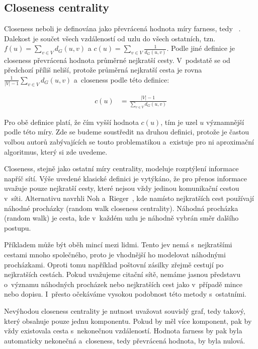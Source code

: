 \documentclass{bakalarka}
\begin{document}
\subsection{Closeness centrality}
Closeness neboli  je definována jako převrácená hodnota míry
farness, tedy ~\citep{sabidussi1966}. Dalekost je součet všech
vzdáleností od uzlu do všech ostatních, tzn. $f(u) = \sum_{v \in V} d_G(u, v)$
a $c(u) = \sum_{v \in V} \frac{1}{d_G(u, v)}$. Podle jiné definice je closeness
převrácená hodnota průměrné nejkratší cesty. V~podstatě se od předchozí příliš
neliší, protože průměrná nejkratší cesta je rovna $\frac{1}{|V|
- 1} \sum_{v \in V} d_G(u, v)$ a~closeness podle této definice:

\begin{align*}
c(u) &= \frac{|V| - 1}{\sum_{v \in V} d_G(u, v)}
\end{align*}

Pro obě definice platí, že čím vyšší hodnota $c(u)$, tím je uzel $u$
významnější podle této míry. Zde se budeme soustředit na druhou definici,
protože je častou volbou autorů zabývajících se touto problematikou a~existuje
pro ni aproximační algoritmus, který si zde uvedeme.

Closeness, stejně jako ostatní míry centrality, modeluje rozptýlení informace
napříč sítí. Výše uvedené klasické definici je vytýkáno, že pro přenos
informace uvažuje pouze nejkratší cesty, které nejsou vždy jedinou komunikační
cestou v~síti. Alternativu navrhli Noh a~Rieger~\citep{nohrieger2004}, kde
namísto nejkratších cest používají náhodné procházky (random walk closeness
centrality). Náhodná procházka (random walk) je cesta, kde v~každém uzlu je
náhodně vybrán směr dalšího postupu.

Příkladem může být oběh mincí mezi lidmi. Tento jev nemá s~nejkratšími cestami
mnoho společného, proto je vhodnější ho modelovat náhodnými procházkami. Oproti
tomu například poštovní zásilky zřejmě cestují po nejkratších cestách. Pokud
uvažujeme citační sítě, nemáme jasnou představu o~významu náhodných procházek
nebo nejkratších cest jako v~případě mince nebo dopisu. I~přesto očekáváme
vysokou podobnost této metody s~ostatními.

Nevýhodou closeness centrality je nutnost uvažovat souvislý graf, tedy takový,
který obsahuje pouze jednu komponentu. Pokud by měl více komponent, pak by vždy
existovala cesta s~nekonečnou vzdáleností. Hodnota farness by pak byla
automaticky nekonečná a~closeness, tedy převrácená hodnota, by byla nulová. 
\end{document}
